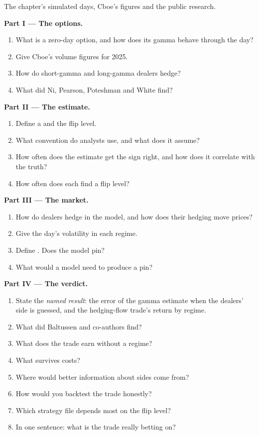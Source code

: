 \begin{problem}\label{pb:s2:zero-day-options-and-dealer-gamma-flows:1}
The chapter's simulated days, Cboe's figures and the public research.

\medskip\noindent\textbf{Part I --- The options.}
\begin{enumerate}
\item What is a zero-day option, and how does its gamma behave through the day?
\item Give Cboe's volume figures for 2025.
\item How do short-gamma and long-gamma dealers hedge?
\item What did Ni, Pearson, Poteshman and White find?
\end{enumerate}

\medskip\noindent\textbf{Part II --- The estimate.}
\begin{enumerate}[resume]
\item Define a  and the flip level.
\item What convention do analysts use, and what does it assume?
\item How often does the estimate get the sign right, and how does it correlate with the truth?
\item How often does each find a flip level?
\end{enumerate}

\medskip\noindent\textbf{Part III --- The market.}
\begin{enumerate}[resume]
\item How do dealers hedge in the model, and how does their hedging move prices?
\item Give the day's volatility in each regime.
\item Define . Does the model pin?
\item What would a model need to produce a pin?
\end{enumerate}

\medskip\noindent\textbf{Part IV --- The verdict.}
\begin{enumerate}[resume]
\item State the \emph{named result}: the error of the gamma estimate when the dealers' side is guessed, and the hedging-flow trade's return by
regime.
\item What did Baltussen and co-authors find?
\item What does the trade earn without a regime?
\item What survives costs?
\item Where would better information about sides come from?
\item How would you backtest the trade honestly?
\item Which strategy file depends most on the flip level?
\item In one sentence: what is the trade really betting on?
\end{enumerate}
\end{problem}

